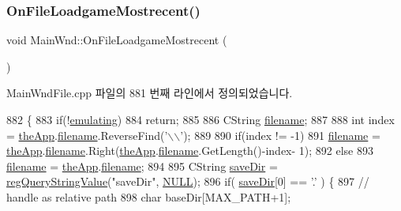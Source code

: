 \subsubsection{\texorpdfstring{On\+File\+Loadgame\+Mostrecent()}{OnFileLoadgameMostrecent()}}
{\footnotesize\ttfamily void Main\+Wnd\+::\+On\+File\+Loadgame\+Mostrecent (\begin{DoxyParamCaption}{ }\end{DoxyParamCaption})\hspace{0.3cm}{\ttfamily [protected]}}



Main\+Wnd\+File.\+cpp 파일의 881 번째 라인에서 정의되었습니다.


\begin{DoxyCode}
882 \{
883   \textcolor{keywordflow}{if}(!\mbox{\hyperlink{_main_wnd_file_8cpp_af9cc36078b1b311753963297ae7f2a74}{emulating}})
884     \textcolor{keywordflow}{return};
885 
886   CString \mbox{\hyperlink{_s_d_l_8cpp_ac33a174c39700095ca0f892624d85a3f}{filename}};
887 
888   \textcolor{keywordtype}{int} index = \mbox{\hyperlink{_v_b_a_8cpp_a8095a9d06b37a7efe3723f3218ad8fb3}{theApp}}.\mbox{\hyperlink{class_v_b_a_a66eee6b61ec8bee20f21164cb0c37d2d}{filename}}.ReverseFind(\textcolor{charliteral}{'\(\backslash\)\(\backslash\)'});
889 
890   \textcolor{keywordflow}{if}(index != -1)
891     \mbox{\hyperlink{_s_d_l_8cpp_ac33a174c39700095ca0f892624d85a3f}{filename}} = \mbox{\hyperlink{_v_b_a_8cpp_a8095a9d06b37a7efe3723f3218ad8fb3}{theApp}}.\mbox{\hyperlink{class_v_b_a_a66eee6b61ec8bee20f21164cb0c37d2d}{filename}}.Right(\mbox{\hyperlink{_v_b_a_8cpp_a8095a9d06b37a7efe3723f3218ad8fb3}{theApp}}.\mbox{\hyperlink{class_v_b_a_a66eee6b61ec8bee20f21164cb0c37d2d}{filename}}.GetLength()-index-
      1);
892   \textcolor{keywordflow}{else}
893     \mbox{\hyperlink{_s_d_l_8cpp_ac33a174c39700095ca0f892624d85a3f}{filename}} = \mbox{\hyperlink{_v_b_a_8cpp_a8095a9d06b37a7efe3723f3218ad8fb3}{theApp}}.\mbox{\hyperlink{class_v_b_a_a66eee6b61ec8bee20f21164cb0c37d2d}{filename}};
894 
895   CString \mbox{\hyperlink{_s_d_l_8cpp_a7b37d94db9ce90c610565cb80ff50444}{saveDir}} = \mbox{\hyperlink{_reg_8cpp_a618826d274df0d9c19fab2ff28bd9008}{regQueryStringValue}}(\textcolor{stringliteral}{"saveDir"}, 
      \mbox{\hyperlink{getopt1_8c_a070d2ce7b6bb7e5c05602aa8c308d0c4}{NULL}});
896   \textcolor{keywordflow}{if}( \mbox{\hyperlink{_s_d_l_8cpp_a7b37d94db9ce90c610565cb80ff50444}{saveDir}}[0] == \textcolor{charliteral}{'.'} ) \{
897       \textcolor{comment}{// handle as relative path}
898       \textcolor{keywordtype}{char} baseDir[MAX\_PATH+1];

\end{DoxyCode}
